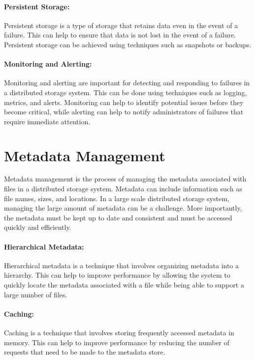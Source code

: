 \paragraph{Persistent Storage:} Persistent storage is a type of storage that retains data even in the event of a failure. This can help to ensure that data is not lost in the event of a failure. Persistent storage can be achieved using techniques such as snapshots or backups.

\paragraph{Monitoring and Alerting:} Monitoring and alerting are important for detecting and responding to failures in a distributed storage system. This can be done using techniques such as logging, metrics, and alerts. Monitoring can help to identify potential issues before they become critical, while alerting can help to notify administrators of failures that require immediate attention.

\section{Metadata Management}
Metadata management is the process of managing the metadata associated with files in a distributed storage system. Metadata can include information such as file names, sizes, and locations. In a large scale distributed storage system, managing the large amount of metadata can be a challenge. More importantly, the metadata must be kept up to date and consistent and must be accessed quickly and efficiently.

\paragraph{Hierarchical Metadata:} Hierarchical metadata is a technique that involves organizing metadata into a hierarchy. This can help to improve performance by allowing the system to quickly locate the metadata associated with a file while being able to support a large number of files.

\paragraph{Caching:} Caching is a technique that involves storing frequently accessed metadata in memory. This can help to improve performance by reducing the number of requests that need to be made to the metadata store.


